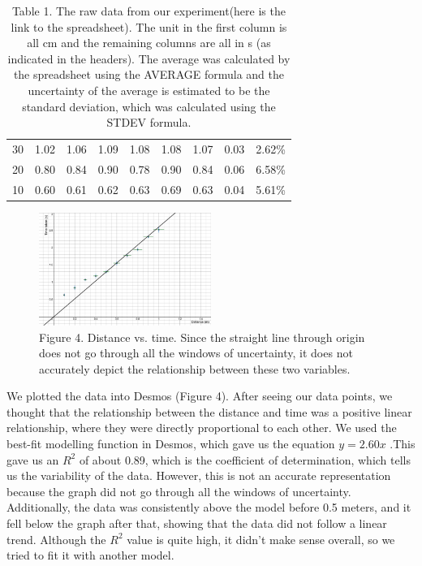 \documentclass[12pt]{report}
\begin{document}
\begin{table}[]
\begin{tabular}{ccccccccc}
        30                                                 & 1.02                                             & 1.06    & 1.09    & 1.08    & 1.08    & 1.07                  & 0.03                   & 2.62\%                  \\
        20                                                 & 0.80                                             & 0.84    & 0.90    & 0.78    & 0.90    & 0.84                  & 0.06                   & 6.58\%                  \\
        10                                                 & 0.60                                             & 0.61    & 0.62    & 0.63    & 0.69    & 0.63                  & 0.04                   & 5.61\%
    \end{tabular}
    \caption{Table 1. The raw data from our experiment(here is the link to the spreadsheet). The unit in the first column is all cm and the remaining columns are all in s (as indicated in the headers). The average was calculated by the spreadsheet using the AVERAGE formula and the uncertainty of the average is estimated to be the standard deviation, which was calculated using the STDEV formula.}
\end{table}
\begin{figure}
    \centering
    \includegraphics[width=0.5\textwidth]{graph.png}
    \caption{Figure 4. Distance vs. time. Since the straight line through origin does not go through all the windows of uncertainty, it does not accurately depict the relationship between these two variables. }
\end{figure}
\newline
We plotted the data into Desmos (Figure 4). After seeing our data points, we thought that the relationship between the distance and time was a positive linear relationship, where they were directly proportional to each other. We used the best-fit modelling function in Desmos, which gave us the equation $y=2.60x$ .This gave us an $R^2$ of about 0.89, which is the coefficient of determination, which tells us the variability of the data. However, this is not an accurate representation because the graph did not go through all the windows of uncertainty. Additionally, the data was consistently above the model before 0.5 meters, and it fell below the graph after that, showing that the data did not follow a linear trend. Although the $R^2$ value is quite high, it didn’t make sense overall, so we tried to fit it with another model.
\end{document}
